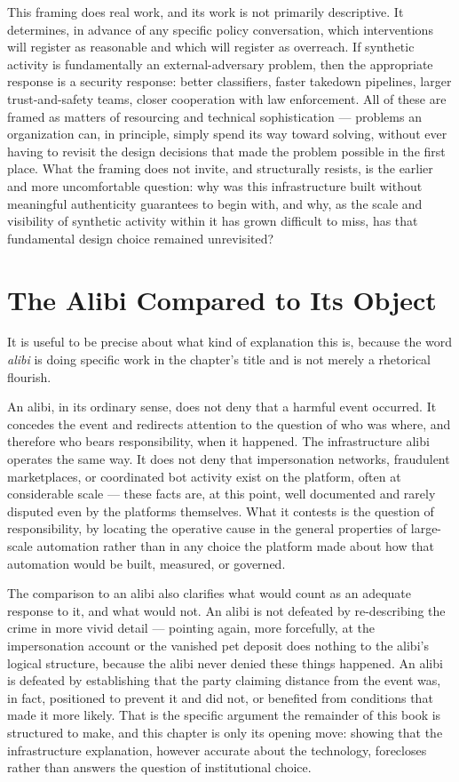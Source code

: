 \documentclass[12pt,a4paper]{book}
\begin{document}
This framing does real work, and its work is not primarily descriptive. It determines, in advance of any specific policy conversation, which interventions will register as reasonable and which will register as overreach. If synthetic activity is fundamentally an external-adversary problem, then the appropriate response is a security response: better classifiers, faster takedown pipelines, larger trust-and-safety teams, closer cooperation with law enforcement. All of these are framed as matters of resourcing and technical sophistication — problems an organization can, in principle, simply spend its way toward solving, without ever having to revisit the design decisions that made the problem possible in the first place. What the framing does not invite, and structurally resists, is the earlier and more uncomfortable question: why was this infrastructure built without meaningful authenticity guarantees to begin with, and why, as the scale and visibility of synthetic activity within it has grown difficult to miss, has that fundamental design choice remained unrevisited?

\section{The Alibi Compared to Its Object}

It is useful to be precise about what kind of explanation this is, because the word \emph{alibi} is doing specific work in the chapter's title and is not merely a rhetorical flourish.

An alibi, in its ordinary sense, does not deny that a harmful event occurred. It concedes the event and redirects attention to the question of who was where, and therefore who bears responsibility, when it happened. The infrastructure alibi operates the same way. It does not deny that impersonation networks, fraudulent marketplaces, or coordinated bot activity exist on the platform, often at considerable scale — these facts are, at this point, well documented and rarely disputed even by the platforms themselves. What it contests is the question of responsibility, by locating the operative cause in the general properties of large-scale automation rather than in any choice the platform made about how that automation would be built, measured, or governed.

The comparison to an alibi also clarifies what would count as an adequate response to it, and what would not. An alibi is not defeated by re-describing the crime in more vivid detail — pointing again, more forcefully, at the impersonation account or the vanished pet deposit does nothing to the alibi's logical structure, because the alibi never denied these things happened. An alibi is defeated by establishing that the party claiming distance from the event was, in fact, positioned to prevent it and did not, or benefited from conditions that made it more likely. That is the specific argument the remainder of this book is structured to make, and this chapter is only its opening move: showing that the infrastructure explanation, however accurate about the technology, forecloses rather than answers the question of institutional choice.
\end{document}

